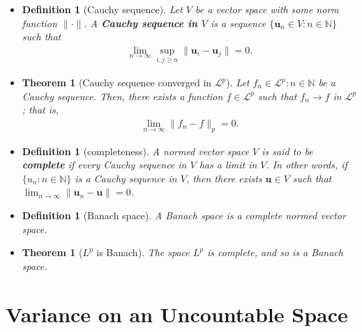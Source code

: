 \documentclass[10pt]{article}
\newtheorem{theorem}[lemma]{Theorem}
\newtheorem{definition}[lemma]{Definition}
\numberwithin{lemma}{section}
\newcommand{\ve}[1]{\mathbf{#1}}
\newcommand{\mcal}[1]{\mathcal{#1}}
\newcommand{\Nat}{\mathbb{N}}
\begin{document}
\begin{itemize}
  \item \begin{definition}[Cauchy sequence]
    Let $V$ be a vector space with some norm function $\| \cdot \|$. A {\bf Cauchy sequence in $V$} is a sequence $\{ \ve{u}_n \in V : n \in \Nat \}$ such that
    \begin{align*}
      \lim_{n \rightarrow \infty} \sup_{i,j \geq n} \| \ve{u}_i - \ve{u}_j \| = 0.
    \end{align*} 
  \end{definition}

  \item \begin{theorem}[Cauchy sequence converged in $\mcal{L}^p$]
    Let ${f_n \in \mcal{L}^p : n \in \Nat}$ be a Cauchy sequence. Then, there exists a function $f \in \mcal{L}^p$ such that $f_n \rightarrow f$ in $\mcal{L}^p$; that is,
    \begin{align*}
      \lim_{n \rightarrow \infty} \| f_n - f \|_p = 0. 
    \end{align*}
  \end{theorem}

  \item \begin{definition}[completeness]
    A normed vector space $V$ is said to be {\bf complete} if every Cauchy sequence in $V$ has a limit in $V$. In other words, if $\{ u_n : n \in \Nat \}$ is a Cauchy sequence in $V$, then there exists $\ve{u} \in V$ such that $\lim_{n \rightarrow \infty} \| \ve{u}_n - \ve{u} \| = 0$.
  \end{definition}
  
  \item \begin{definition}[Banach space]
    A {Banach space} is a complete normed vector space.
  \end{definition}

  \item \begin{theorem}[$L^p$ is Banach]
    The space $L^p$ is complete, and so is a Banach space.
  \end{theorem}
\end{itemize}

\section{Variance on an Uncountable Space}
\end{document}
